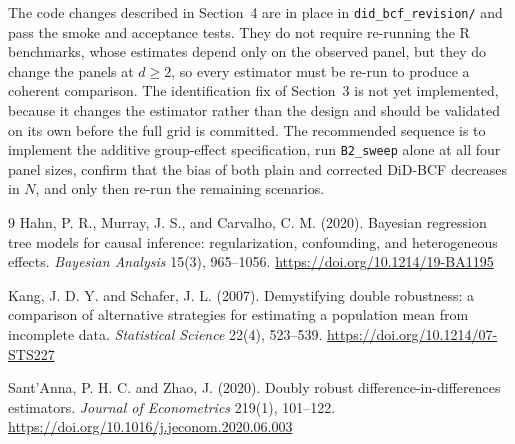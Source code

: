 \documentclass[11pt]{article}
\begin{document}
The code changes described in Section~4 are in place in
\texttt{did\_bcf\_revision/} and pass the smoke and acceptance tests. They do
not require re-running the R benchmarks, whose estimates depend only on the
observed panel, but they do change the panels at $d \geq 2$, so every estimator
must be re-run to produce a coherent comparison. The identification fix of
Section~3 is not yet implemented, because it changes the estimator rather than
the design and should be validated on its own before the full grid is
committed. The recommended sequence is to implement the additive
group-effect specification, run \texttt{B2\_sweep} alone at all four panel
sizes, confirm that the bias of both plain and corrected DiD-BCF decreases in
$N$, and only then re-run the remaining scenarios.

\begin{thebibliography}{9}
Hahn, P. R., Murray, J. S., and Carvalho, C. M. (2020).
Bayesian regression tree models for causal inference: regularization,
confounding, and heterogeneous effects.
\emph{Bayesian Analysis} 15(3), 965--1056.
\url{https://doi.org/10.1214/19-BA1195}

Kang, J. D. Y. and Schafer, J. L. (2007).
Demystifying double robustness: a comparison of alternative strategies for
estimating a population mean from incomplete data.
\emph{Statistical Science} 22(4), 523--539.
\url{https://doi.org/10.1214/07-STS227}

Sant'Anna, P. H. C. and Zhao, J. (2020).
Doubly robust difference-in-differences estimators.
\emph{Journal of Econometrics} 219(1), 101--122.
\url{https://doi.org/10.1016/j.jeconom.2020.06.003}
\end{thebibliography}
\end{document}
